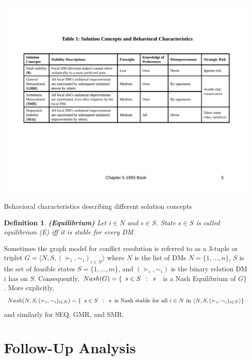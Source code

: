 \documentclass[letterpaper,12pt,titlepage,oneside,final]{book}
\newtheorem{definition}[lemma]{Definition}
\begin{document}
\begin{table}[H]
\centering
\includegraphics[scale=.75]{PDF-IMG/tablecomp.pdf}

\caption{Behavioral characteristics describing different solution concepts}

\label{tbl:behchar}
\end{table}

\begin{definition}
\rm {\bf (Equilibrium)}  Let $i \in N$ and $s \in
S$. State $s \in S$ is called \emph{equilibrium} (\emph{E}) \emph{iff} it is stable for every DM.
\end{definition}

Sometimes the graph model for conflict resolution is referred to as a 3-tuple or triplet $G=\langle N,S,(\succ_i,\sim_i)_{i\in N}\rangle$ where $N$ is the list of DMs $N=\{1,\dots ,n\}$, $S$ is the set of feasible states $S=\{1,\dots ,m\}$, and $(\succ_i,\sim_i)$ is the binary relation DM $i$ has on $S$. Consequently, $Nash(G)=\{ \enskip s \in S \enskip : \enskip s \enskip$  is a Nash Equilibrium of $G \}$. More explicitly, $$Nash(N,S,(\succ_i,\sim_i)_{i\in N})=\{ \enskip s \in S \enskip : \enskip s \enskip  \text{is Nash stable for all } i \in N \text{ in } \langle N,S,(\succ_i,\sim_i)_{i\in N}\rangle \}$$ and similarly for SEQ, GMR, and SMR.


\section{Follow-Up Analysis}
\end{document}

